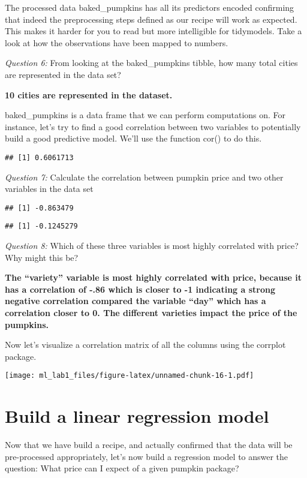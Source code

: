 \documentclass[
]{article}
\begin{document}
The processed data baked\_pumpkins has all its predictors encoded
confirming that indeed the preprocessing steps defined as our recipe
will work as expected. This makes it harder for you to read but more
intelligible for tidymodels. Take a look at how the observations have
been mapped to numbers.

\emph{Question 6:} From looking at the baked\_pumpkins tibble, how many
total cities are represented in the data set?

\textbf{10 cities are represented in the dataset.}

baked\_pumpkins is a data frame that we can perform computations on. For
instance, let's try to find a good correlation between two variables to
potentially build a good predictive model. We'll use the function cor()
to do this.

\begin{verbatim}
## [1] 0.6061713
\end{verbatim}

\emph{Question 7:} Calculate the correlation between pumpkin price and
two other variables in the data set

\begin{verbatim}
## [1] -0.863479
\end{verbatim}

\begin{verbatim}
## [1] -0.1245279
\end{verbatim}

\emph{Question 8:} Which of these three variables is most highly
correlated with price? Why might this be?

\textbf{The ``variety'' variable is most highly correlated with price,
because it has a correlation of -.86 which is closer to -1 indicating a
strong negative correlation compared the variable ``day'' which has a
correlation closer to 0. The different varieties impact the price of the
pumpkins.}

Now let's visualize a correlation matrix of all the columns using the
corrplot package.

\texttt{[image: ml\_lab1\_files/figure-latex/unnamed-chunk-16-1.pdf]}

\hypertarget{build-a-linear-regression-model}{%
\section{Build a linear regression
model}\label{build-a-linear-regression-model}}

Now that we have build a recipe, and actually confirmed that the data
will be pre-processed appropriately, let's now build a regression model
to answer the question: What price can I expect of a given pumpkin
package?
\end{document}
